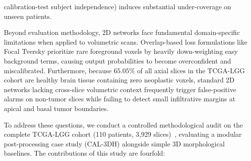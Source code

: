 \documentclass[11pt,a4paper]{article}
\begin{document}
calibration-test subject independence) induces substantial under-coverage on unseen patients.

Beyond evaluation methodology, 2D networks face fundamental domain-specific limitations when applied to volumetric scans. Overlap-based loss formulations like Focal Tversky prioritize rare foreground voxels by heavily down-weighting easy background terms, causing output probabilities to become overconfident and miscalibrated. Furthermore, because $65.05\%$ of all axial slices in the TCGA-LGG cohort are healthy brain tissue containing zero neoplastic voxels, standard 2D networks lacking cross-slice volumetric context frequently trigger false-positive alarms on non-tumor slices while failing to detect small infiltrative margins at apical and basal tumor boundaries.

To address these questions, we conduct a controlled methodological audit on the complete TCGA-LGG cohort (110 patients, 3,929 slices)~\cite{buda2019association}, evaluating a modular post-processing case study (CAL-3DH) alongside simple 3D morphological baselines. The contributions of this study are fourfold:
\end{document}
